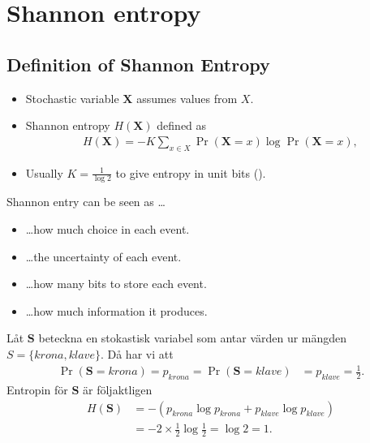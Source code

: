 \documentclass{beamer}
\let\stoch\mathbf{}
\begin{document}
\section{Shannon entropy}

\subsection{Definition of Shannon Entropy}

\begin{frame}
  \begin{definition}
    \begin{itemize}
      \item Stochastic variable \(\stoch X\) assumes values from \(X\).
      \item Shannon entropy \(H(\stoch X)\) defined as
        \begin{align*}
          H(\stoch X) = -K \sum_{x\in X} \Pr(\stoch X = x)\log \Pr(\stoch X = x),
        \end{align*}
      \item Usually \(K = \frac{1}{\log 2}\) to give entropy in unit bits  
        (\si{\bit}).
    \end{itemize}
  \end{definition}
\end{frame}

\begin{frame}
  \begin{block}{Shannon entry can be seen as \dots}
    \begin{itemize}
      \item \dots how much choice in each event.

      \item \dots the uncertainty of each event.

      \item \dots how many bits to store each event.

      \item \dots how much information it produces.

    \end{itemize}
  \end{block}
\end{frame}

\begin{frame}
  \begin{example}
    Låt \(\stoch S\) beteckna en stokastisk variabel som antar värden ur 
    mängden \(S = \{krona, klave\}\).
    Då har vi att
    \begin{align*}
      \Pr(\stoch S = krona) = p_{krona} = \Pr(\stoch S = klave) &= p_{klave} 
      = \frac{1}{2}.
    \end{align*}
    Entropin för \(\stoch S\) är följaktligen
    \begin{align*}
      H(\stoch S) &= -\left( p_{krona}\log p_{krona} + p_{klave}\log p_{klave} 
      \right) \\
        &= -2\times \frac{1}{2}\log \frac{1}{2} = \log 2 = 1.
    \end{align*}
  \end{example}
\end{frame}
\end{document}

